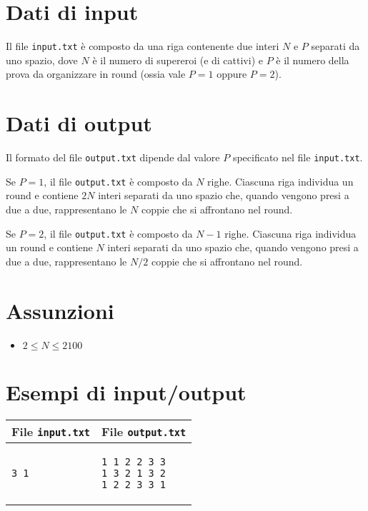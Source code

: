 \documentclass[a4paper,11pt]{article}
\begin{document}
\section*{Dati di input}
  
Il file \texttt{input.txt} è composto da una riga
contenente due interi $N$ e
$P$ separati da uno spazio, dove $N$ è il
numero di supereroi (e di cattivi) e $P$ è il numero
della prova da organizzare in round (ossia vale $P=1$
oppure $P=2$).


\section*{Dati di output}
  
Il formato del file \texttt{output.txt} dipende dal valore $P$
specificato nel file \texttt{input.txt}.

Se $P=1$, il file \texttt{output.txt} è composto
da $N$ righe.  Ciascuna riga individua un round e
contiene $2N$ interi separati da uno spazio che, quando
vengono presi a due a due, rappresentano le $N$ coppie che si
affrontano nel round.

Se $P=2$, il file \texttt{output.txt} è composto
da $N-1$ righe.  Ciascuna riga individua un round e
contiene $N$ interi separati da uno spazio che, quando
vengono presi a due a due, rappresentano le $N/2$ coppie che si
affrontano nel round.

  \section*{Assunzioni}
  \begin{itemize}
  
    \item $2 ≤ N ≤ 2 100$
  \end{itemize}

\section*{Esempi di input/output}

  
    \noindent
    \begin{tabular}{p{11cm}|p{5cm}}
    \toprule
    \textbf{File \texttt{input.txt}}
    & \textbf{File \texttt{output.txt}}
    \\
    \midrule
    \scriptsize
    \begin{verbatim}
3 1
\end{verbatim}
    &
    \scriptsize
    \begin{verbatim}
1 1 2 2 3 3
1 3 2 1 3 2
1 2 2 3 3 1
\end{verbatim}
    \\
    \bottomrule
    \end{tabular}
  
\end{document}
